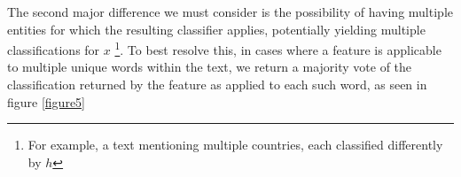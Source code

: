 \documentclass[twoside,11pt]{article}
\theoremstyle{definition}
\begin{document}
The second major difference we must consider is the possibility of having multiple entities for which the resulting classifier applies, potentially yielding multiple classifications for $x$ \footnote{For example, a text mentioning multiple countries, each classified differently by $h$}. To best resolve this, in cases where a feature is applicable to multiple unique words within the text, we return a majority vote of the classification returned by the feature as applied to each such word, as seen in figure \ref{figure5}







\end{document}
